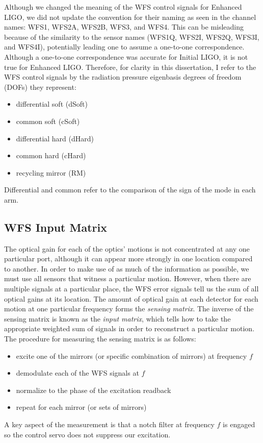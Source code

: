 Although we changed the meaning of the WFS control signals for
Enhanced LIGO, we did not update the convention for their naming as
seen in the channel names: WFS1, WFS2A, WFS2B, WFS3, and WFS4. This
can be misleading because of the similarity to the sensor names
(WFS1Q, WFS2I, WFS2Q, WFS3I, and WFS4I), potentially leading one to
assume a one-to-one correspondence. Although a one-to-one
correspondence was accurate for Initial LIGO, it is not true for
Enhanced LIGO. Therefore, for clarity in this dissertation, I refer to
the WFS control signals by the radiation pressure eigenbasis degrees
of freedom (DOFs) they represent:
\begin{itemize}
\item differential soft (dSoft) \\
\item common soft (cSoft) \\
\item differential hard (dHard) \\
\item common hard (cHard) \\
\item recycling mirror (RM)
\end{itemize}
Differential and common refer to the comparison of the sign of the mode in each arm.




\subsection{WFS Input Matrix}
\label{sec:inputmatrix}
The optical gain for each of the optics' motions is not concentrated
at any one particular port, although it can appear more strongly in
one location compared to another. In order to make use of as much of
the information as possible, we must use all sensors that witness a
particular motion. However, when there are multiple signals at a
particular place, the WFS error signals tell us the sum of all optical
gains at its location. The amount of optical gain at each detector for
each motion at one particular frequency forms the \emph{sensing
  matrix}. The inverse of the sensing matrix is known as the
\emph{input matrix}, which tells how to take the appropriate weighted
sum of signals in order to reconstruct a particular motion. The
procedure for measuring the sensing matrix is as follows:
\begin{itemize}
\item excite one of the mirrors (or specific combination of mirrors)
  at frequency $f$ \vspace{-10pt}
\item demodulate each of the WFS signals at $f$ \vspace{-10pt}
\item normalize to the phase of the excitation readback \vspace{-10pt}
\item repeat for each mirror (or sets of mirrors)
\end{itemize}
A key aspect of the measurement is that a notch filter at frequency
$f$ is engaged so the control servo does not suppress our excitation.

